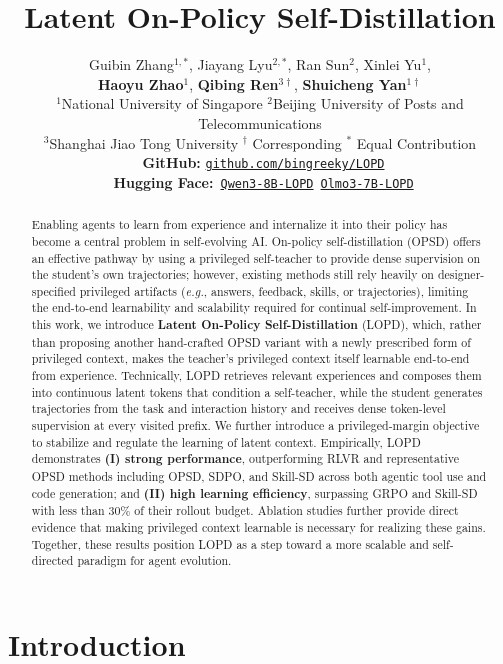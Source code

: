 \documentclass{article} %
\title{Latent On-Policy Self-Distillation}
\author{Guibin Zhang$^{1,*}$, Jiayang Lyu$^{2,*}$, Ran Sun$^2$, Xinlei Yu$^{1}$, \\
\textbf{Haoyu Zhao}$^{1}$, \textbf{Qibing Ren}$^{3\dagger}$, \textbf{Shuicheng Yan}$^{1\dagger}$
\\[0.25em]
$^1$National University of Singapore\; $^2$Beijing University of Posts and Telecommunications \\
$^3$Shanghai Jiao Tong University $^\dagger$ Corresponding $^*$ Equal Contribution 
\\[0.05em]
\faGithub\ \textbf{GitHub:} \href{https://github.com/bingreeky/LOPD}{\texttt{github.com/bingreeky/LOPD}}\\[-0.02em]
\hficon\ \textbf{Hugging Face:}\quad
\qwenicon\,\href{https://huggingface.co/liunanfu1992/Qwen3-8B-LOPD}{\texttt{Qwen3-8B-LOPD}}\quad
\olmoicon\,\href{https://huggingface.co/liunanfu1992/OLMo-3-7B-Think-LOPD}{\texttt{Olmo3-7B-LOPD}}
}
\newcommand{\ourmethod}{{\textsc{LOPD}}\xspace}
\begin{document}
\maketitle
{}

\begin{abstract}
Enabling agents to learn from experience and internalize it into their policy has become a central problem in self-evolving AI. On-policy self-distillation (OPSD) offers an effective pathway by using a privileged self-teacher to provide dense supervision on the student's own trajectories; however, existing methods still rely heavily on designer-specified privileged artifacts (\textit{e.g.}, answers, feedback, skills, or trajectories), limiting the end-to-end learnability and scalability required for continual self-improvement. In this work, we introduce \textbf{Latent On-Policy Self-Distillation} (\ourmethod), which, rather than proposing another hand-crafted OPSD variant with a newly prescribed form of privileged context, makes the teacher's privileged context itself learnable end-to-end from experience. Technically, \ourmethod retrieves relevant experiences and composes them into continuous latent tokens that condition a self-teacher, while the student generates trajectories from the task and interaction history and receives dense token-level supervision at every visited prefix. We further introduce a privileged-margin objective to stabilize and regulate the learning of latent context. Empirically, \ourmethod demonstrates \textbf{(I) strong performance}, outperforming RLVR and representative OPSD methods including OPSD, SDPO, and Skill-SD across both agentic tool use and code generation; and \textbf{(II) high learning efficiency}, surpassing GRPO and Skill-SD with less than $30\%$ of their rollout budget. Ablation studies further provide direct evidence that making privileged context learnable is necessary for realizing these gains. Together, these results position \ourmethod as a step toward a more scalable and self-directed paradigm for agent evolution.
\end{abstract}

\vspace{-0.4em}
\section{Introduction}
\end{document}

